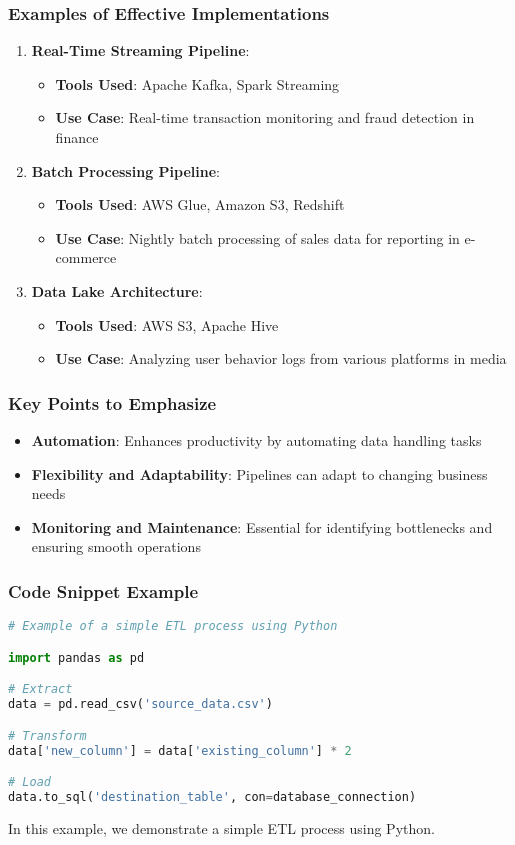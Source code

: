 \documentclass[aspectratio=169]{beamer}
\begin{document}
\begin{frame}
    \frametitle{Examples of Effective Implementations}
    \begin{enumerate}
        \item \textbf{Real-Time Streaming Pipeline}:
            \begin{itemize}
                \item \textbf{Tools Used}: Apache Kafka, Spark Streaming
                \item \textbf{Use Case}: Real-time transaction monitoring and fraud detection in finance
            \end{itemize}
        \item \textbf{Batch Processing Pipeline}:
            \begin{itemize}
                \item \textbf{Tools Used}: AWS Glue, Amazon S3, Redshift
                \item \textbf{Use Case}: Nightly batch processing of sales data for reporting in e-commerce
            \end{itemize}
        \item \textbf{Data Lake Architecture}:
            \begin{itemize}
                \item \textbf{Tools Used}: AWS S3, Apache Hive
                \item \textbf{Use Case}: Analyzing user behavior logs from various platforms in media
            \end{itemize}
    \end{enumerate}
\end{frame}

\begin{frame}
    \frametitle{Key Points to Emphasize}
    \begin{itemize}
        \item \textbf{Automation}: Enhances productivity by automating data handling tasks
        \item \textbf{Flexibility and Adaptability}: Pipelines can adapt to changing business needs
        \item \textbf{Monitoring and Maintenance}: Essential for identifying bottlenecks and ensuring smooth operations
    \end{itemize}
\end{frame}

\begin{frame}[fragile]
    \frametitle{Code Snippet Example}
    \begin{lstlisting}[language=Python]
# Example of a simple ETL process using Python

import pandas as pd

# Extract
data = pd.read_csv('source_data.csv')

# Transform
data['new_column'] = data['existing_column'] * 2

# Load
data.to_sql('destination_table', con=database_connection)
    \end{lstlisting}
    In this example, we demonstrate a simple ETL process using Python. 
\end{frame}
\end{document}
